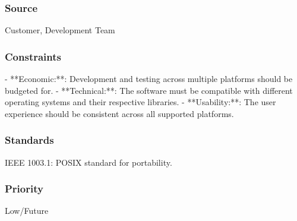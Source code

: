 \subsubsection{Source}
Customer, Development Team
\subsubsection{Constraints}
- **Economic:**: Development and testing across multiple platforms should be budgeted for.
- **Technical:**: The software must be compatible with different operating systems and their respective libraries.
- **Usability:**: The user experience should be consistent across all supported platforms.
\subsubsection{Standards}
IEEE 1003.1: POSIX standard for portability.
\subsubsection{Priority}
Low/Future
